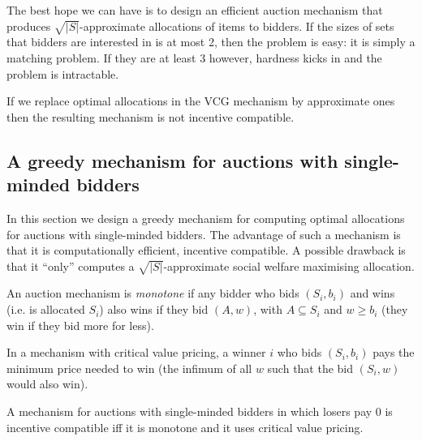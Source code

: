 				The best hope we can have is to design an efficient auction
				mechanism that produces $\sqrt{|S|}$-approximate allocations of
				items to bidders. If the sizes of sets that bidders are
				interested in is at most 2, then the problem is easy: it is
				simply a matching problem. If they are at least 3 however,
				hardness kicks in and the problem is intractable.

				\begin{fact}
					If we replace optimal allocations in the VCG mechanism by
					approximate ones then the resulting mechanism is not
					incentive compatible.
				\end{fact}

		\subsection{A greedy mechanism for auctions with single-minded bidders}
			In this section we design a greedy mechanism for computing optimal
			allocations for auctions with single-minded bidders. The advantage
			of such a mechanism is that it is computationally efficient,
			incentive compatible. A possible drawback is that it ``only''
			computes a $\sqrt{|S|}$-approximate social welfare maximising
			allocation.

			An auction mechanism is \emph{monotone} if any bidder who bids
			$(S_i, b_i)$ and wins (i.e. is allocated $S_i$) also wins if they
			bid $(A, w)$, with $A \subseteq S_i$ and $w \ge b_i$ (they win if
			they bid more for less).

			\begin{definition}
				In a mechanism with critical value pricing, a winner $i$ who
				bids $(S_i, b_i)$ pays the minimum price needed to win (the
				infimum of all $w$ such that the bid $(S_i, w)$ would also
				win).
			\end{definition}

			\begin{lemma}
				\label{lem:singleMindedDSIC}
				A mechanism for auctions with single-minded bidders in which
				losers pay 0 is incentive compatible iff it is monotone and it
				uses critical value pricing.
			\end{lemma}

